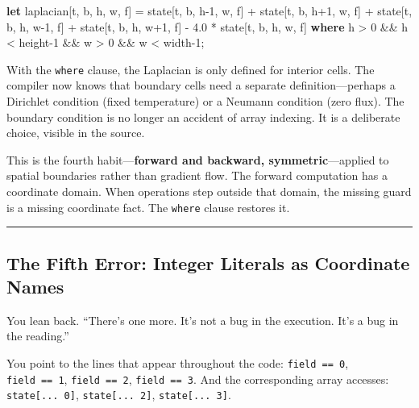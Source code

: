\documentclass[11pt,]{article}
\newenvironment{Shaded}{}{}
\newcommand{\DecValTok}[1]{\textcolor[rgb]{0.25,0.63,0.44}{#1}}
\newcommand{\KeywordTok}[1]{\textcolor[rgb]{0.00,0.44,0.13}{\textbf{#1}}}
\newcommand{\NormalTok}[1]{#1}
\newcommand{\OperatorTok}[1]{\textcolor[rgb]{0.40,0.40,0.40}{#1}}
\begin{document}
\begin{Shaded}
\begin{Highlighting}[]
\KeywordTok{let}\NormalTok{ laplacian}\OperatorTok{[}\NormalTok{t, b, h, w, f}\OperatorTok{]}\NormalTok{ =}
\NormalTok{    state}\OperatorTok{[}\NormalTok{t, b, h-}\DecValTok{1}\NormalTok{, w, f}\OperatorTok{]}\NormalTok{ +}
\NormalTok{    state}\OperatorTok{[}\NormalTok{t, b, h+}\DecValTok{1}\NormalTok{, w, f}\OperatorTok{]}\NormalTok{ +}
\NormalTok{    state}\OperatorTok{[}\NormalTok{t, b, h, w-}\DecValTok{1}\NormalTok{, f}\OperatorTok{]}\NormalTok{ +}
\NormalTok{    state}\OperatorTok{[}\NormalTok{t, b, h, w+}\DecValTok{1}\NormalTok{, f}\OperatorTok{]}\NormalTok{ -}
    \DecValTok{4.0}\NormalTok{ * state}\OperatorTok{[}\NormalTok{t, b, h, w, f}\OperatorTok{]}
    \KeywordTok{where}\NormalTok{ h > }\DecValTok{0}\NormalTok{ && h < height-}\DecValTok{1}\NormalTok{ && w > }\DecValTok{0}\NormalTok{ && w < width-}\DecValTok{1}\NormalTok{;}
\end{Highlighting}
\end{Shaded}

With the \texttt{where} clause, the Laplacian is only defined for
interior cells. The compiler now knows that boundary cells need a
separate definition---perhaps a Dirichlet condition (fixed temperature)
or a Neumann condition (zero flux). The boundary condition is no longer
an accident of array indexing. It is a deliberate choice, visible in the
source.

This is the fourth habit---\textbf{forward and backward,
symmetric}---applied to spatial boundaries rather than gradient flow.
The forward computation has a coordinate domain. When operations step
outside that domain, the missing guard is a missing coordinate fact. The
\texttt{where} clause restores it.

\begin{center}\rule{0.5\linewidth}{0.4pt}\end{center}

\hypertarget{the-fifth-error-integer-literals-as-coordinate-names}{%
\subsection{The Fifth Error: Integer Literals as Coordinate
Names}\label{the-fifth-error-integer-literals-as-coordinate-names}}

You lean back. ``There's one more. It's not a bug in the execution. It's
a bug in the reading.''

You point to the lines that appear throughout the code:
\texttt{field\ ==\ 0}, \texttt{field\ ==\ 1}, \texttt{field\ ==\ 2},
\texttt{field\ ==\ 3}. And the corresponding array accesses:
\texttt{state{[}...\ 0{]}}, \texttt{state{[}...\ 2{]}},
\texttt{state{[}...\ 3{]}}.
\end{document}
